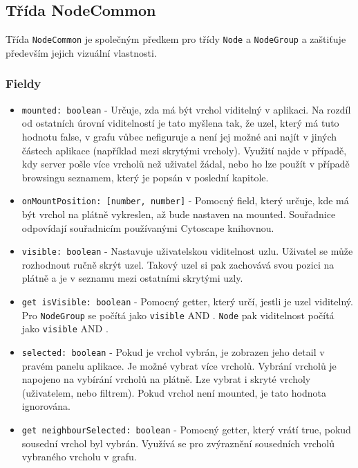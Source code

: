\subsection{Třída NodeCommon}
Třída \texttt{NodeCommon} je společným předkem pro třídy \texttt{Node} a \texttt{NodeGroup} a zaštiťuje především jejich vizuální vlastnosti.

\subsubsection*{Fieldy}
\begin{itemize}
  \item \texttt{mounted: boolean} - Určuje, zda má být vrchol viditelný v aplikaci. Na rozdíl od ostatních úrovní viditelností je tato myšlena tak, že uzel, který má tuto hodnotu false, v grafu vůbec nefiguruje a není jej možné ani najít v jiných částech aplikace (například mezi skrytými vrcholy). Využití najde v případě, kdy server pošle více vrcholů než uživatel žádal, nebo ho lze použít v případě browsingu seznamem, který je popsán v poslední kapitole.

  \item \texttt{onMountPosition: [number, number]} - Pomocný field, který určuje, kde má být vrchol na plátně vykreslen, až bude nastaven na mounted. Souřadnice odpovídají souřadnicím používanými Cytoscape knihovnou.

  \item \texttt{visible: boolean} - Nastavuje uživatelskou viditelnost uzlu. Uživatel se může rozhodnout ručně skrýt uzel. Takový uzel si pak zachovává svou pozici na plátně a je v seznamu mezi ostatními skrytými uzly.

  \item \texttt{get isVisible: boolean} - Pomocný getter, který určí, jestli je uzel viditelný. Pro \texttt{NodeGroup} se počítá jako \texttt{visible} AND .  \texttt{Node} pak viditelnost počítá jako \texttt{visible} AND .

  \item \texttt{selected: boolean} - Pokud je vrchol vybrán, je zobrazen jeho detail v pravém panelu aplikace. Je možné vybrat více vrcholů. Vybrání vrcholů je napojeno na vybírání vrcholů na plátně. Lze vybrat i skryté vrcholy (uživatelem, nebo filtrem). Pokud vrchol není mounted, je tato hodnota ignorována.

  \item \texttt{get neighbourSelected: boolean} - Pomocný getter, který vrátí true, pokud sousední vrchol byl vybrán. Využívá se pro zvýraznění sousedních vrcholů vybraného vrcholu v grafu.


\end{itemize}
